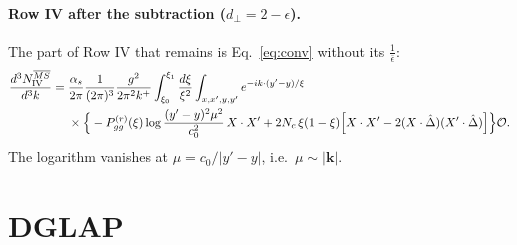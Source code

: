 \documentclass[10pt]{article}
\numberwithin{equation}{section}
\newcommand{\Dh}{\hat\Delta}
\newcommand{\OO}{\mathcal O}
\newcommand{\pre}{\frac{1}{(2\pi)^3}\frac{g^2}{2\pi^2k^+}}
\begin{document}
\paragraph{Row IV after the subtraction ($d_\perp=2-\epsilon$).} The part of Row IV that remains is Eq.~\eqref{eq:conv} without its $\frac{1}{\bar\epsilon}$:
\begin{align}
\frac{d^3N^{\overline{MS}}_{\rm IV}}{d^3k}={}&\frac{\alpha_s}{2\pi}\pre\int_{\xi_0}^{\xi_1}\frac{d\xi}{\xi^2}\int_{x,x',y,y'}e^{-ik\cdot(y'-y)/\xi}\notag\\
&\times\Big\{-P^{(r)}_{gg}(\xi)\log\frac{(y'-y)^2\mu^2}{c_0^2}\,X\cdot X'+2N_c\,\xi(1-\xi)\Big[X\cdot X'-2(X\cdot\Dh)(X'\cdot\Dh)\Big]\Big\}\OO .
\end{align}
The logarithm vanishes at $\mu=c_0/|y'-y|$, i.e.\ $\mu\sim|\mathbf k|$.

\section{DGLAP}\label{sec:dglap}
\end{document}
